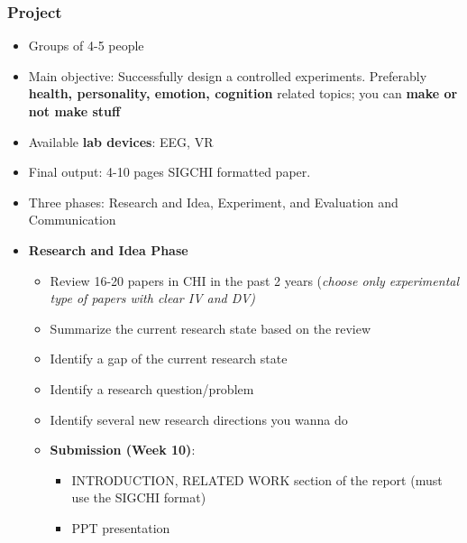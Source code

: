 \documentclass{beamer}
\begin{document}
\begin{frame}
\frametitle{Project}
\footnotesize
\begin{itemize}
	\item Groups of 4-5 people
	\item Main objective:  Successfully design a controlled experiments.   Preferably \textbf{health, personality, emotion, cognition} related topics;  you can \textbf{make or not make stuff }
	\item Available \textbf{lab devices}: EEG, VR
	\item Final output: 4-10 pages SIGCHI formatted paper.
	\item Three phases: Research and Idea, Experiment, and Evaluation and Communication
	\item \textbf{Research and Idea Phase}
	\begin{itemize}
		\item Review 16-20 papers in CHI in the past 2 years (\textit{choose only experimental type of papers with clear IV and DV)}
		\item Summarize the current research state based on the review
		\item Identify a gap of the current research state
		\item Identify a research question/problem
		\item Identify several new research directions you wanna do
		\item \textbf{Submission (Week 10)}:
		\begin{itemize}
			\item  INTRODUCTION, RELATED WORK section of the report (must use the SIGCHI format)
			\item PPT presentation
		\end{itemize}
	\end{itemize}
\end{itemize}
\end{frame}
\end{document}
